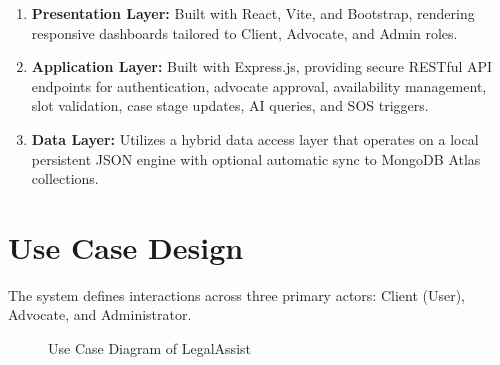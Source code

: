 \documentclass[12pt,a4paper]{report}
\begin{document}
\begin{enumerate}
    \item \textbf{Presentation Layer:} Built with React, Vite, and Bootstrap, rendering responsive dashboards tailored to Client, Advocate, and Admin roles.
    \item \textbf{Application Layer:} Built with Express.js, providing secure RESTful API endpoints for authentication, advocate approval, availability management, slot validation, case stage updates, AI queries, and SOS triggers.
    \item \textbf{Data Layer:} Utilizes a hybrid data access layer that operates on a local persistent JSON engine with optional automatic sync to MongoDB Atlas collections.
\end{enumerate}

\section{Use Case Design}
The system defines interactions across three primary actors: Client (User), Advocate, and Administrator.

\begin{figure}[h!]
    \centering
    \caption{Use Case Diagram of LegalAssist}
    \label{fig:use_case}
\end{figure}
\end{document}
